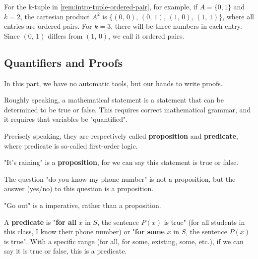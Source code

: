 \documentclass[../src/handouts/main.tex]{subfiles}
\begin{document}
For the k-tuple in \cref{rem:intro-tuple-ordered-pair}, for example, if $A = \{0, 1\}$ and $k = 2$, the cartesian product $A^2$ is $\{ (0,\, 0),\, (0,\, 1),\, (1,\, 0),\, (1,\, 1) \}$, where all entries are ordered pairs. For $k = 3$, there will be three numbers in each entry. Since $(0,\, 1)$ differs from $(1,\, 0)$, we call it ordered pairs.

\subsection{Quantifiers and Proofs}

In this part, we have no automatic tools, but our hands to write proofs.

Roughly speaking, a mathematical statement is a statement that can be determined to be true or false.
This requires correct mathematical grammar, and it requires that variables be "quantified".

Precisely speaking, they are respectively called \textbf{proposition} and \textbf{predicate}, where predicate is so-called first-order logic.

"It's raining" is a \textbf{proposition}, for we can say this statement is true or false.

The question "do you know my phone number" is not a proposition, but the answer (yes/no) to this question is a proposition.

"Go out" is a imperative, rather than a proposition.

A \textbf{predicate} is "\textbf{for all} $x$ in $S$, the sentence $P(x)$ is true" (for all students in this class, I know their phone number) or "\textbf{for some} $x$ in $S$, the sentence $P(x)$ is true". With a specific range (for all, for some, existing, some, etc.), if we can say it is true or false, this is a predicate.
\end{document}
